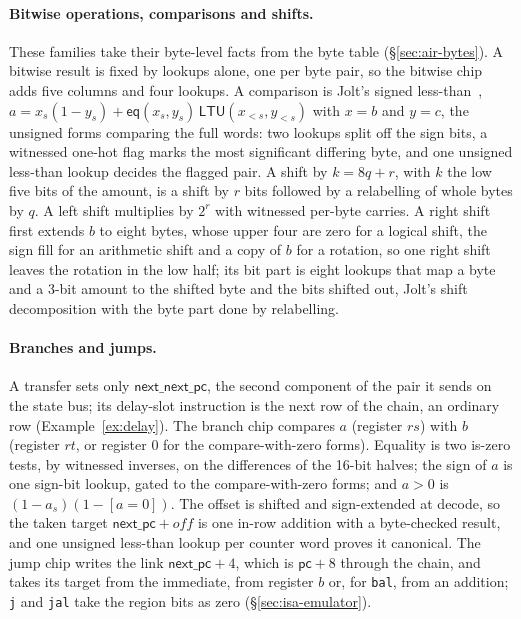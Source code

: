 \paragraph{Bitwise operations, comparisons and shifts.}\label{sec:base-shift} These families take their byte-level facts from the byte table (\S\ref{sec:air-bytes}). A bitwise result is fixed by lookups alone, one per byte pair, so the bitwise chip adds five columns and four lookups. A comparison is Jolt's signed less-than~\citep{jolt}, $a = x_s(1-y_s) + \mathsf{eq}(x_s, y_s)\,\mathsf{LTU}(x_{<s}, y_{<s})$ with $x = b$ and $y = c$, the unsigned forms comparing the full words: two lookups split off the sign bits, a witnessed one-hot flag marks the most significant differing byte, and one unsigned less-than lookup decides the flagged pair. A shift by $k = 8q + r$, with $k$ the low five bits of the amount, is a shift by $r$ bits followed by a relabelling of whole bytes by $q$. A left shift multiplies by $2^{r}$ with witnessed per-byte carries. A right shift first extends $b$ to eight bytes, whose upper four are zero for a logical shift, the sign fill for an arithmetic shift and a copy of $b$ for a rotation, so one right shift leaves the rotation in the low half; its bit part is eight lookups that map a byte and a 3-bit amount to the shifted byte and the bits shifted out, Jolt's shift decomposition with the byte part done by relabelling.

\paragraph{Branches and jumps.}\label{sec:base-control} A transfer sets only $\mathsf{next\_next\_pc}$, the second component of the pair it sends on the state bus; its delay-slot instruction is the next row of the chain, an ordinary row (Example~\ref{ex:delay}). The branch chip compares $a$ (register $\mathit{rs}$) with $b$ (register $\mathit{rt}$, or register 0 for the compare-with-zero forms). Equality is two is-zero tests, by witnessed inverses, on the differences of the 16-bit halves; the sign of $a$ is one sign-bit lookup, gated to the compare-with-zero forms; and $a > 0$ is $(1 - a_s)(1 - [a = 0])$. The offset is shifted and sign-extended at decode, so the taken target $\mathsf{next\_pc} + \mathit{off}$ is one in-row addition with a byte-checked result, and one unsigned less-than lookup per counter word proves it canonical. The jump chip writes the link $\mathsf{next\_pc} + 4$, which is $\mathsf{pc} + 8$ through the chain, and takes its target from the immediate, from register $b$ or, for \texttt{bal}, from an addition; \texttt{j} and \texttt{jal} take the region bits as zero (\S\ref{sec:isa-emulator}).

